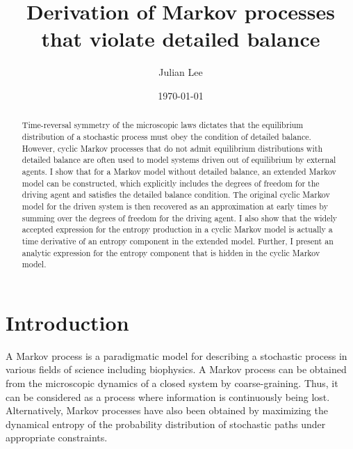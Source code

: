 \documentclass[aps,pre,amsmath,amssymb,floatfix,preprint,nofootinbib]{revtex4}
\begin{document}
\title{Derivation of Markov processes that violate detailed balance}
\author{Julian Lee}
\date{\today}
\begin{abstract}
Time-reversal symmetry of the microscopic laws dictates that the equilibrium distribution of a stochastic process must obey the condition of detailed balance. However, cyclic Markov processes that do not admit equilibrium distributions with detailed balance are often used to model systems driven out of equilibrium by external agents. I show that for a Markov model without detailed balance, an extended Markov model can be constructed, which explicitly includes the degrees of freedom for the driving agent and satisfies the detailed balance condition. The original cyclic Markov model for the driven system is then recovered as an approximation at early times by summing over the degrees of freedom for the driving agent. I also show that the widely accepted expression for the entropy production in a cyclic Markov model is actually a time derivative of an entropy component in the extended model. Further, I present an analytic expression for the entropy component that is hidden in the cyclic Markov model. 
\end{abstract}
\maketitle
\section{Introduction}
A Markov process\cite{kamp,chung} is a paradigmatic model for describing a stochastic process in various fields of science including biophysics\cite{ken07,ken15,gop,sung2,brown,feng,Pande1,chodera,Chu,Hyeon}. A Markov process can be obtained from the microscopic dynamics of a closed system by coarse-graining\cite{groot,zwan}. Thus, it can be considered as a process where information is continuously being lost. Alternatively, Markov processes have also been obtained by maximizing the dynamical entropy of the probability distribution of stochastic paths under appropriate constraints\cite{rmp,ken,sl}.
\end{document}
